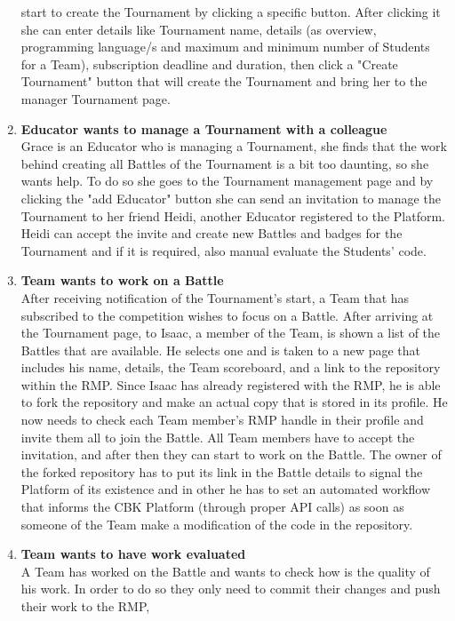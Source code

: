 \begin{enumerate}[label= \textbf{SC\arabic*}]
    start to create the Tournament by clicking a specific button. After clicking it she can enter details like Tournament name, details (as overview, programming language/s and maximum and minimum number of Students for a Team),
    subscription deadline and duration, then click a "Create Tournament" button that will create the Tournament and bring her to the manager Tournament page. 
    \item \textbf{Educator wants to manage a Tournament with a colleague} \label{sc:sc6}\\ Grace is an Educator who is managing a Tournament, she finds that the work behind creating all Battles of the Tournament is a bit too daunting, so she wants 
    help. To do so she goes to the Tournament management page and by clicking the "add Educator" button she can send an invitation to manage the Tournament to her friend Heidi, another Educator registered to the Platform. Heidi 
    can accept the invite and create new Battles and badges for the Tournament and if it is required, also manual evaluate the Students' code.
    \item \textbf{Team wants to work on a Battle} \label{sc:sc7} \\ After receiving notification of the Tournament's start, a Team that has subscribed to the competition wishes to focus on a Battle. After arriving at the Tournament page, to Isaac, 
    a member of the Team, is shown a list of the Battles that are available. He selects one and is taken to a new page that includes his name, details, the Team scoreboard, and a link to the repository within the RMP. Since Isaac 
    has already registered with the RMP, he is able to fork the repository and make an actual copy that is stored in its profile. He now needs to check each Team member's RMP handle in their profile and invite them all to join the 
    Battle. All Team members have to accept the invitation, and after then they can start to work on the Battle. The owner of the forked repository has to put its link in the Battle details to signal the Platform of its existence and in
    other he has to set an automated workflow that informs the CBK Platform (through proper API calls) as soon as someone of the Team make a modification of the code in the repository.
    \item \textbf{Team wants to have work evaluated} \label{sc:sc8} \\ A Team has worked on the Battle and wants to check how is the quality of his work. In order to do so they only need to commit their changes and push their work to the RMP, 

\end{enumerate}
